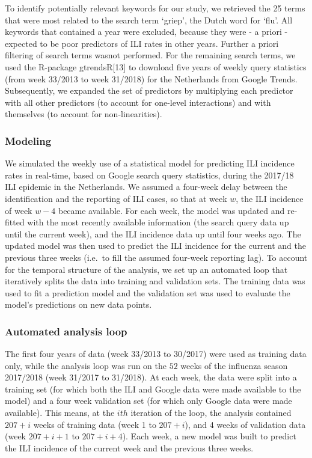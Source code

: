 \documentclass[]{article}
\begin{document}
To identify potentially relevant keywords for our study, we retrieved
the 25 terms that were most related to the search term `griep', the
Dutch word for `flu'. All keywords that contained a year were excluded,
because they were - a priori - expected to be poor predictors of ILI
rates in other years. Further a priori filtering of search terms wasnot
performed. For the remaining search terms, we used the R-package
gtrendsR{[}13{]} to download five years of weekly query statistics (from
week 33/2013 to week 31/2018) for the Netherlands from Google Trends.
Subsequently, we expanded the set of predictors by multiplying each
predictor with all other predictors (to account for one-level
interactions) and with themselves (to account for non-linearities).

\hypertarget{modeling}{%
\subsubsection{\texorpdfstring{\textbf{Modeling}}{Modeling}}\label{modeling}}

We simulated the weekly use of a statistical model for predicting ILI
incidence rates in real-time, based on Google search query statistics,
during the 2017/18 ILI epidemic in the Netherlands. We assumed a
four-week delay between the identification and the reporting of ILI
cases, so that at week \(w\), the ILI incidence of week \(w-4\) became
available. For each week, the model was updated and re-fitted with the
most recently available information (the search query data up until the
current week), and the ILI incidence data up until four weeks ago. The
updated model was then used to predict the ILI incidence for the current
and the previous three weeks (i.e.~to fill the assumed four-week
reporting lag). To account for the temporal structure of the analysis,
we set up an automated loop that iteratively splits the data into
training and validation sets. The training data was used to fit a
prediction model and the validation set was used to evaluate the model's
predictions on new data points.

\hypertarget{automated-analysis-loop}{%
\subsubsection{\texorpdfstring{\textbf{Automated analysis
loop}}{Automated analysis loop}}\label{automated-analysis-loop}}

The first four years of data (week 33/2013 to 30/2017) were used as
training data only, while the analysis loop was run on the \(52\) weeks
of the influenza season 2017/2018 (week 31/2017 to 31/2018). At each
week, the data were split into a training set (for which both the ILI
and Google data were made available to the model) and a four week
validation set (for which only Google data were made available). This
means, at the \(ith\) iteration of the loop, the analysis contained
\(207 + i\) weeks of training data (week 1 to \(207 + i\)), and 4 weeks
of validation data (week \(207 + i + 1\) to \(207 + i + 4\)). Each week,
a new model was built to predict the ILI incidence of the current week
and the previous three weeks.
\end{document}
